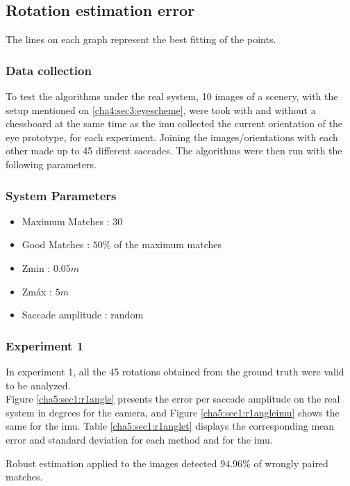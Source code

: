 \subsection{Rotation estimation error}
The lines on each graph represent the best fitting of the points.
\subsubsection{Data collection}
To test the algorithms under the real system, 10 images of a scenery, with the setup mentioned on \ref{cha4:sec3:eyescheme}, were took with and without a chessboard at the same time as the \acrshort{imu} collected the current orientation of the eye prototype, for each experiment. Joining the images/orientations with each other made up to 45 different saccades. The algorithms were then run with the following parameters.
\subsubsection{System Parameters}
\begin{itemize}
	\item Maximum Matches : $30$
	\item Good Matches : $50 \%$ of the maximum matches
	\item Zmin : $0.05 m$
	\item Zmáx : $5 m$
	\item Saccade amplitude : random
\end{itemize}
\subsubsection{Experiment 1}
In experiment 1, all the 45 rotations obtained from the ground truth were valid to be analyzed.\\
Figure \ref{cha5:sec1:r1angle} presents the error per saccade amplitude on the real system in degrees for the camera, and Figure \ref{cha5:sec1:r1angleimu} shows the same for the \acrshort{imu}. Table \ref{cha5:sec1:r1anglet} displays the corresponding mean error and standard deviation for each method and for the \acrshort{imu}.

Robust estimation applied to the images detected $ 94.96 \%$ of wrongly paired matches. 

